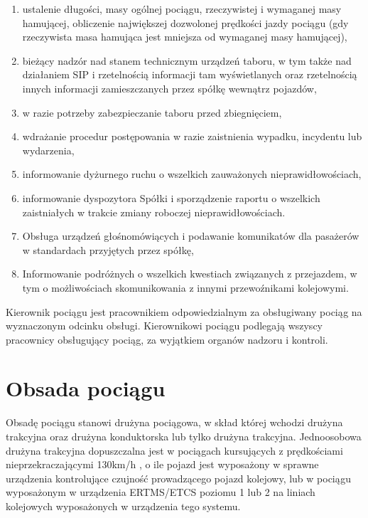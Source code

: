 \begin{enumerate}
	\item ustalenie długości, masy ogólnej pociągu, rzeczywistej i wymaganej masy hamującej, obliczenie największej dozwolonej prędkości jazdy pociągu (gdy rzeczywista masa hamująca jest mniejsza od wymaganej masy hamującej),
	\item bieżący nadzór nad stanem technicznym urządzeń taboru, w tym także nad działaniem SIP i rzetelnością informacji tam wyświetlanych oraz rzetelnością innych informacji zamieszczanych przez spółkę wewnątrz pojazdów,
	\item w razie potrzeby zabezpieczanie taboru przed zbiegnięciem,
	\item wdrażanie procedur postępowania w razie zaistnienia wypadku, incydentu lub wydarzenia,
	\item informowanie dyżurnego ruchu o wszelkich zauważonych nieprawidłowościach,
	\item informowanie dyspozytora Spółki i sporządzenie raportu o wszelkich zaistniałych w trakcie zmiany roboczej nieprawidłowościach.
	\item Obsługa urządzeń głośnomówiących i podawanie komunikatów dla pasażerów w standardach przyjętych przez spółkę,
	\item Informowanie podróżnych o wszelkich kwestiach związanych z przejazdem, w tym o możliwościach skomunikowania z innymi przewoźnikami kolejowymi.
\end{enumerate}
Kierownik pociągu jest pracownikiem odpowiedzialnym za obsługiwany pociąg na wyznaczonym odcinku obsługi. Kierownikowi pociągu podlegają wszyscy
pracownicy obsługujący pociąg, za wyjątkiem organów nadzoru i kontroli.

\section{Obsada pociągu}
\label{sec:obsada}
Obsadę pociągu stanowi drużyna pociągowa, w skład której wchodzi drużyna trakcyjna oraz drużyna konduktorska lub tylko drużyna trakcyjna. Jednoosobowa drużyna trakcyjna dopuszczalna jest w pociągach kursujących z prędkościami nieprzekraczającymi 130km/h , o ile pojazd jest wyposażony w sprawne urządzenia kontrolujące czujność prowadzącego pojazd kolejowy, lub w pociągu wyposażonym w urządzenia ERTMS/ETCS poziomu 1 lub 2 na liniach kolejowych wyposażonych w urządzenia tego systemu. 

